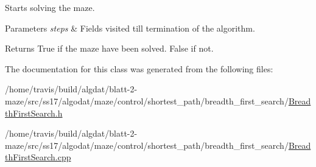 Starts solving the maze. 
\begin{DoxyParams}{Parameters}
{\em steps} & Fields visited till termination of the algorithm. \\
\hline
\end{DoxyParams}
\begin{DoxyReturn}{Returns}
True if the maze have been solved. False if not. 
\end{DoxyReturn}


The documentation for this class was generated from the following files\-:\begin{DoxyCompactItemize}
\item 
/home/travis/build/algdat/blatt-\/2-\/maze/src/ss17/algodat/maze/control/shortest\-\_\-path/breadth\-\_\-first\-\_\-search/\hyperlink{_breadth_first_search_8h}{Breadth\-First\-Search.\-h}\item 
/home/travis/build/algdat/blatt-\/2-\/maze/src/ss17/algodat/maze/control/shortest\-\_\-path/breadth\-\_\-first\-\_\-search/\hyperlink{_breadth_first_search_8cpp}{Breadth\-First\-Search.\-cpp}\end{DoxyCompactItemize}
